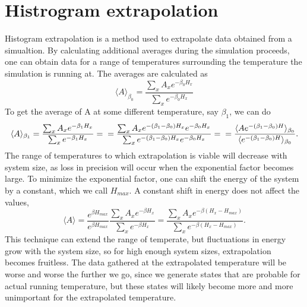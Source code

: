 \section{Histrogram extrapolation}
Histogram extrapolation is a method used to extrapolate data obtained from a simualtion.
By calculating additional averages during the simulation proceeds, one can obtain data for a range of temperatures surrounding the temperature the simulation is running at.
The averages are calculated as
\begin{equation}
  \langle A \rangle_{\beta_0} =  \frac{\sum_{x}A_x e^{-\beta_0 H_x}}{\sum_{x}e^{-\beta_0 H_x}}
\end{equation}
To get the average of A at some different temperature, say $\beta_1$, we can do
\begin{equation}
  \langle A \rangle_{\beta_1} =  \frac{\sum_{x}A_x e^{-\beta_1 H_x}}{\sum_{x}e^{- \beta_1 H_x}} = \\
  = \frac{\sum_x A_x e^{-(\beta_1 - \beta_0)H_x} e^{-\beta_0 H_x}}{\sum_x e^{-(\beta_1 - \beta_0)H_x}e^{-\beta_0 H_x}} = \\
  = \frac{\langle A e^{-(\beta_1 - \beta_0)H}\rangle_{\beta_0}}{\langle e^{-(\beta_1 - \beta_0)H}\rangle_{\beta_0}}.
\end{equation}
The range of temperatures to which extrapolation is viable will decrease with system size,
as loss in precision will occur when the exponential factor becomes large. To minimize the exponential factor, one can shift the energy of the system by a constant, which we call $H_{max}$. A constant shift in energy does not affect the values, 
\begin{equation}
  \langle A \rangle = \frac{e^{\beta H_{max}}}{e^{\beta H_{max}}}\frac{\sum_x A_x e^{-\beta H_x}}{\sum_x e^{-\beta H_x}}= \frac{\sum_x A_x e^{-\beta(H_x-H_{max})}}{\sum_x e^{-\beta(H_x-H_{max})}}.
  \label{}
\end{equation}
This technique can extend the range of temperate, but fluctuations in energy grow with the system size, so for high enough system sizes, extrapolation becomes fruitless.
The data gathered at the extrapolated temperature will be worse and worse the further we go, since we generate states that are probable for actual running temperature, but these states will likely become more and more unimportant for the extrapolated temperature.



